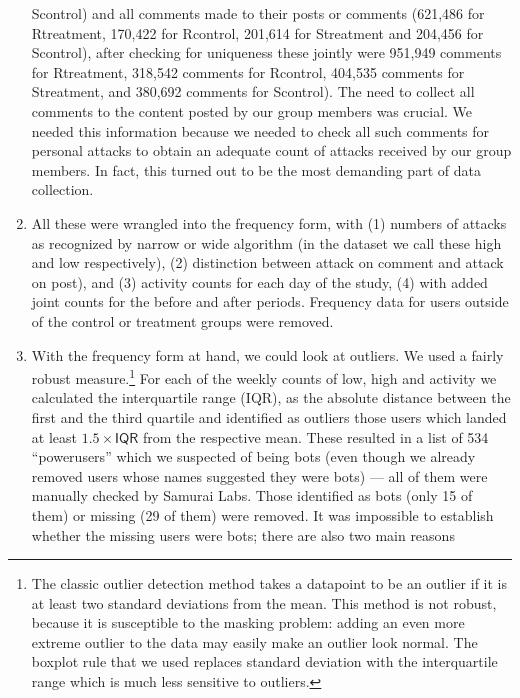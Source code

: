 \documentclass[10pt,]{scrartcl}
\begin{document}
\begin{enumerate}
  \textsf{Scontrol}) and all comments made to their posts or comments
  (621,486 for \textsf{Rtreatment}, 170,422 for \textsf{Rcontrol},
  201,614 for \textsf{Streatment} and 204,456 for \textsf{Scontrol}),
  after checking for uniqueness these jointly were 951,949 comments for
  \textsf{Rtreatment}, 318,542 comments for \textsf{Rcontrol}, 404,535
  comments for \textsf{Streatment}, and 380,692 comments for
  \textsf{Scontrol}). The need to collect all comments to the content
  posted by our group members was crucial. We needed this information
  because we needed to check all such comments for personal attacks to
  obtain an adequate count of attacks received by our group members. In
  fact, this turned out to be the most demanding part of data
  collection.
\item
  All these were wrangled into the frequency form, with (1) numbers of
  attacks as recognized by \textsf{narrow} or \textsf{wide} algorithm
  (in the dataset we call these \textsf{high} and \textsf{low}
  respectively), (2) distinction between \textsf{attack on comment} and
  \textsf{attack on post}), and (3) activity counts for each day of the
  study, (4) with added joint counts for the \textsf{befor}e and
  \textsf{after} periods. Frequency data for users outside of the
  control or treatment groups were removed.
\item
  With the frequency form at hand, we could look at outliers. We used a
  fairly robust
  measure.\footnote{The classic outlier detection method takes a datapoint to be an outlier if it is at least two standard deviations from the mean. This method is not robust, because it is susceptible to the masking problem: adding an even more extreme outlier  to the data may easily make an outlier look normal. The boxplot rule that we used replaces standard deviation with the interquartile range which is much less sensitive to outliers.}
  For each of the weekly counts of \textsf{low, high} and
  \textsf{activity} we calculated the interquartile range
  (\textsf{IQR}), as the absolute distance between the first and the
  third quartile and identified as outliers those users which landed at
  least \(1.5\times \textsf{IQR}\) from the respective mean. These
  resulted in a list of 534 ``powerusers'' which we suspected of being
  bots (even though we already removed users whose names suggested they
  were bots) --- all of them were manually checked by
  \textsf{Samurai Labs}. Those identified as bots (only 15 of them) or
  missing (29 of them) were removed. It was impossible to establish
  whether the missing users were bots; there are also two main reasons

\end{enumerate}
\end{document}
